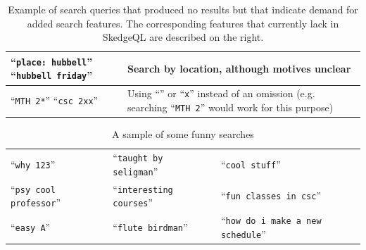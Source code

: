 {\begin{center}
\begin{table}[H]
\begin{tabular}{ p{6cm} p{7.5cm} }
    ``{\tt place: hubbell}'' \newline ``{\tt hubbell friday}'' 
    & Search by location, although motives unclear \\ \hline

    ``{\tt MTH 2*}'' \newline ``{\tt csc 2xx}''
    & Using ``{\tt *}'' or ``{\tt x}'' instead of an omission (e.g. searching ``{\tt MTH 2}'' would work for this purpose) \\ \hline

  \end{tabular}
  \caption{Example of search queries that produced no results but that indicate demand for added search features. The corresponding features that currently lack in SkedgeQL are described on the right.}
  \label{fig:empty-queries}
\end{table}

\vspace{5pt}

\begin{table}[H]
  \centering
  \begin{tabular}{ l l l }

    \hline

    ``{\tt why 123}''
    & ``{\tt taught by seligman}''
    & ``{\tt cool stuff}''
    \\ 

    ``{\tt psy cool professor}''
    & ``{\tt interesting courses}''
    & ``{\tt fun classes in csc}''
    \\ 

    ``{\tt easy A}''
    & ``{\tt flute birdman}''
    & ``{\tt how do i make a new schedule}''
    \\ 

    \hline

  \end{tabular}
  \vspace{10pt}
  \caption{A sample of some funny searches}
  \label{fig:funny-queries}
\end{table}
\end{center}

\doublespacing

}
